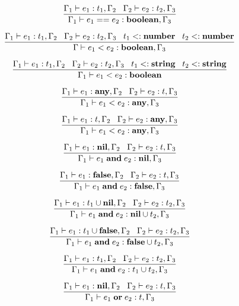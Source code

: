 \[
\dfrac{\Gamma_{1} \vdash e_{1}:t_{1}, \Gamma_{2} \;\;\;
       \Gamma_{2} \vdash e_{2}:t_{2}, \Gamma_{3}}
      {\Gamma_{1} \vdash e_{1} == e_{2}:\mathbf{boolean}, \Gamma_{3}}
\]

\[
\dfrac{\Gamma_{1} \vdash e_{1}:t_{1}, \Gamma_{2} \;\;\;
       \Gamma_{2} \vdash e_{2}:t_{2}, \Gamma_{3} \;\;\;
       t_{1} <: \mathbf{number} \;\;\;
       t_{2} <: \mathbf{number}}
      {\Gamma \vdash e_{1} < e_{2}:\mathbf{boolean}, \Gamma_{3}}
\]

\[
\dfrac{\Gamma_{1} \vdash e_{1}:t_{1}, \Gamma_{2} \;\;\;
       \Gamma_{2} \vdash e_{2}:t_{2}, \Gamma_{3} \;\;\;
       t_{1} <: \mathbf{string} \;\;\;
       t_{2} <: \mathbf{string}}
      {\Gamma_{1} \vdash e_{1} < e_{2}:\mathbf{boolean}}
\]

\[
\dfrac{\Gamma_{1} \vdash e_{1}:\mathbf{any}, \Gamma_{2} \;\;\;
       \Gamma_{2} \vdash e_{2}:t, \Gamma_{3}}
      {\Gamma_{1} \vdash e_{1} < e_{2}:\mathbf{any}, \Gamma_{3}}
\]

\[
\dfrac{\Gamma_{1} \vdash e_{1}:t, \Gamma_{2} \;\;\;
       \Gamma_{2} \vdash e_{2}:\mathbf{any}, \Gamma_{3}}
      {\Gamma_{1} \vdash e_{1} < e_{2}:\mathbf{any}, \Gamma_{3}}
\]

\[
\dfrac{\Gamma_{1} \vdash e_{1}:\mathbf{nil}, \Gamma_{2} \;\;\;
       \Gamma_{2} \vdash e_{2}:t, \Gamma_{3}}
      {\Gamma_{1} \vdash e_{1} \; \mathbf{and} \; e_{2}:\mathbf{nil}, \Gamma_{3}}
\]

\[
\dfrac{\Gamma_{1} \vdash e_{1}:\mathbf{false}, \Gamma_{2} \;\;\;
       \Gamma_{2} \vdash e_{2}:t, \Gamma_{3}}
      {\Gamma_{1} \vdash e_{1} \; \mathbf{and} \; e_{2}:\mathbf{false}, \Gamma_{3}}
\]

\[
\dfrac{\Gamma_{1} \vdash e_{1}:t_{1} \cup \mathbf{nil}, \Gamma_{2} \;\;\;
       \Gamma_{2} \vdash e_{2}:t_{2}, \Gamma_{3}}
      {\Gamma_{1} \vdash e_{1} \; \mathbf{and} \; e_{2}:\mathbf{nil} \cup t_{2}, \Gamma_{3}}
\]

\[
\dfrac{\Gamma_{1} \vdash e_{1}:t_{1} \cup \mathbf{false}, \Gamma_{2} \;\;\;
       \Gamma_{2} \vdash e_{2}:t_{2}, \Gamma_{3}}
      {\Gamma_{1} \vdash e_{1} \; \mathbf{and} \; e_{2}:\mathbf{false} \cup t_{2}, \Gamma_{3}}
\]

\[
\dfrac{\Gamma_{1} \vdash e_{1}:t_{1}, \Gamma_{2} \;\;\;
       \Gamma_{2} \vdash e_{2}:t_{2}, \Gamma_{3}}
      {\Gamma_{1} \vdash e_{1} \; \mathbf{and} \; e_{2}:t_{1} \cup t_{2}, \Gamma_{3}}
\]

\[
\dfrac{\Gamma_{1} \vdash e_{1}:\mathbf{nil}, \Gamma_{2} \;\;\;
       \Gamma_{2} \vdash e_{2}:t, \Gamma_{3}}
      {\Gamma_{1} \vdash e_{1} \; \mathbf{or} \; e_{2}:t, \Gamma_{3}}
\]

